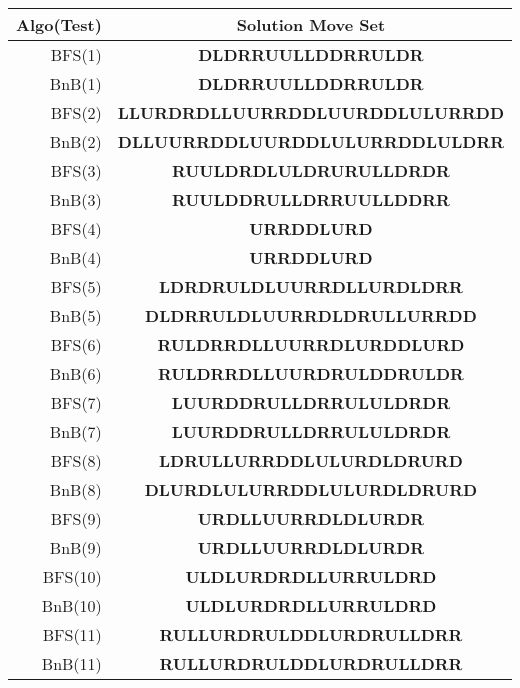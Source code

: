 \begin{table}[ht]
  \centering
  \begin{adjustbox}{width=0.6\textwidth,center}

\begin{tabular}{r|c}
\toprule
\textbf{Algo(Test)} & \textbf{Solution Move Set} \\
\midrule
BFS(1) & \textbf{DLDRRUULLDDRRULDR} \\
BnB(1) & \textbf{DLDRRUULLDDRRULDR} \\ \hline

BFS(2) & \textbf{LLURDRDLLUURRDDLUURDDLULURRDD} \\
BnB(2) & \textbf{DLLUURRDDLUURDDLULURRDDLULDRR} \\ \hline

BFS(3) & \textbf{RUULDRDLULDRURULLDRDR} \\
BnB(3) & \textbf{RUULDDRULLDRRUULLDDRR} \\ \hline

BFS(4) & \textbf{URRDDLURD} \\
BnB(4) & \textbf{URRDDLURD} \\ \hline

BFS(5) & \textbf{LDRDRULDLUURRDLLURDLDRR} \\
BnB(5) & \textbf{DLDRRULDLUURRDLDRULLURRDD} \\ \hline

BFS(6) & \textbf{RULDRRDLLUURRDLURDDLURD} \\
BnB(6) & \textbf{RULDRRDLLUURDRULDDRULDR} \\ \hline

BFS(7) & \textbf{LUURDDRULLDRRULULDRDR} \\
BnB(7) & \textbf{LUURDDRULLDRRULULDRDR} \\ \hline

BFS(8) & \textbf{LDRULLURRDDLULURDLDRURD} \\
BnB(8) & \textbf{DLURDLULURRDDLULURDLDRURD} \\ \hline

BFS(9) & \textbf{URDLLUURRDLDLURDR} \\
BnB(9) & \textbf{URDLLUURRDLDLURDR} \\ \hline

BFS(10) & \textbf{ULDLURDRDLLURRULDRD} \\
BnB(10) & \textbf{ULDLURDRDLLURRULDRD} \\ \hline

BFS(11) & \textbf{RULLURDRULDDLURDRULLDRR} \\
BnB(11) & \textbf{RULLURDRULDDLURDRULLDRR} \\ \hline


\end{tabular}
\end{adjustbox}
\end{table}
